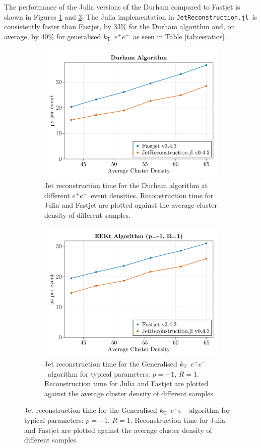 \documentclass{webofc}
\newcommand{\kt}{${k}_\text{T}$}
\newcommand{\JR}{\texttt{JetReconstruction.jl}}
\newcommand{\ee}{$e^+e^-$}
\begin{document}
The performance of the Julia versions of the Durham compared to Fastjet is shown
in Figures \ref{fig:eeDurham} and \ref{fig:eeKt}. The Julia implementation in
\JR\ is consistently faster than Fastjet, by 33\% for the Durham algorithm and,
on average, by 40\% for generalised \kt\ \ee\, as seen in Table \ref{tab:eeratios}.

\begin{figure}[ht]
    \begin{subfigure}{0.47\textwidth}
        \begin{center}
            \includegraphics[width=0.8\linewidth]{Alma9-AMD-Ryzen7-Julia-FastJet-Durham.png}
            \caption{Jet reconstruction time for the Durham algorithm at different \ee\ event densities. Reconstruction time for Julia and Fastjet are plotted against the average cluster density of different samples.}
            \label{fig:eeDurham}
        \end{center}
    \end{subfigure}
    \hfill
    \begin{subfigure}{0.47\textwidth}
        \begin{center}
            \includegraphics[width=0.8\linewidth]{Alma9-AMD-Ryzen7-Julia-FastJet-EEKt-R1.png}
            \caption{Jet reconstruction time for the Generalised \kt\ \ee\ algorithm for typical parameters: $p=-1$, $R=1$. Reconstruction time for Julia and Fastjet are plotted against the average cluster density of different samples.}
            \label{fig:eeKt}
        \end{center}
    \end{subfigure}
\end{figure}
\end{document}
